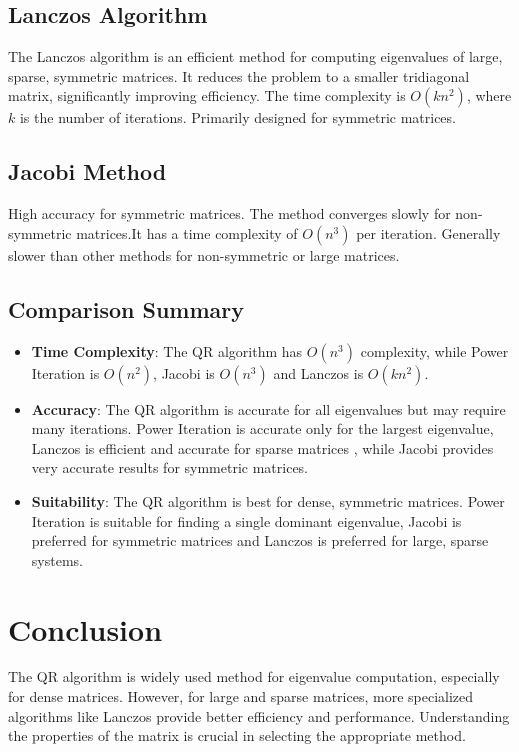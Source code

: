 \documentclass{article}
\theoremstyle{remark}
\begin{document}
\subsection{Lanczos Algorithm}
The Lanczos algorithm is an efficient method for computing eigenvalues of large, sparse, symmetric matrices. It reduces the problem to a smaller tridiagonal matrix, significantly improving efficiency. The time complexity is $O(kn^2)$, where $k$ is the number of iterations. Primarily designed for symmetric matrices.

\subsection{Jacobi Method}
High accuracy for symmetric matrices. The method converges slowly for non-symmetric matrices.It has a time complexity of $O(n^3)$ per iteration. Generally slower than other methods for non-symmetric or large matrices.

\subsection{Comparison Summary}
\begin{itemize}
    \item \textbf{Time Complexity}: The QR algorithm has $O(n^3)$ complexity, while Power Iteration is $O(n^2)$, Jacobi is $O(n^3)$ and Lanczos is $O(kn^2)$.
    \item \textbf{Accuracy}: The QR algorithm is accurate for all eigenvalues but may require many iterations. Power Iteration is accurate only for the largest eigenvalue, Lanczos is efficient and accurate for sparse matrices , while Jacobi provides very accurate results for symmetric matrices.
    \item \textbf{Suitability}: The QR algorithm is best for dense, symmetric matrices. Power Iteration is suitable for finding a single dominant eigenvalue, Jacobi is preferred for symmetric matrices and Lanczos is preferred for large, sparse systems.
\end{itemize}

\section{Conclusion}
The QR algorithm is widely used method for eigenvalue computation, especially for dense matrices. However, for large and sparse matrices, more specialized algorithms like Lanczos provide better efficiency and performance. Understanding the properties of the matrix is crucial in selecting the appropriate method.
\end{document}
